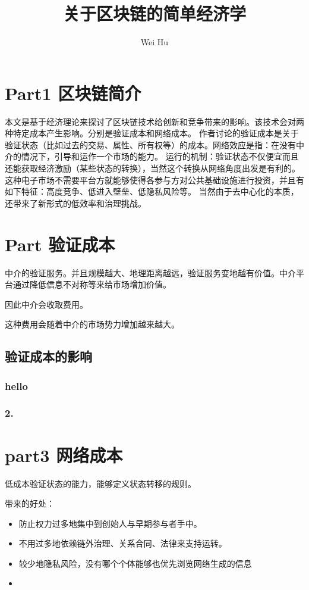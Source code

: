 \documentclass{article}
\begin{document}
\title{关于区块链的简单经济学}
\author{Wei Hu}
\maketitle

\section*{Part1 区块链简介}
本文是基于经济理论来探讨了区块链技术给创新和竞争带来的影响。该技术会对两种特定成本产生影响。分别是验证成本和网络成本。
作者讨论的验证成本是关于验证状态（比如过去的交易、属性、所有权等）的成本。网络效应是指：在没有中介的情况下，引导和运作一个市场的能力。
运行的机制：验证状态不仅便宜而且还能获取经济激励（某些状态的转换），当然这个转换从网络角度出发是有利的。
这种电子市场不需要平台方就能够使得各参与方对公共基础设施进行投资，并且有如下特征：高度竞争、低进入壁垒、低隐私风险等。
当然由于去中心化的本质，还带来了新形式的低效率和治理挑战。

\section*{Part 验证成本}
中介的验证服务。并且规模越大、地理距离越远，验证服务变地越有价值。中介平台通过降低信息不对称等来给市场增加价值。

因此中介会收取费用。

这种费用会随着中介的市场势力增加越来越大。

\subsection*{验证成本的影响}

\subsubsection*{hello}
\subsubsection*{2.}

\section*{part3 网络成本}
低成本验证状态的能力，能够定义状态转移的规则。

带来的好处：
\begin{itemize}
    \item 防止权力过多地集中到创始人与早期参与者手中。
    \item 不用过多地依赖链外治理、关系合同、法律来支持运转。
    \item 较少地隐私风险，没有哪个个体能够也优先浏览网络生成的信息
    \item 
\end{itemize}
\end{document}
